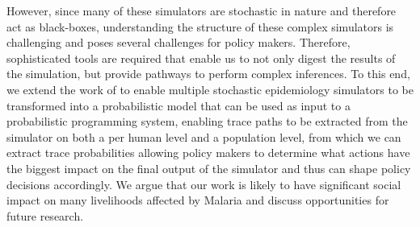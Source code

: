 \documentclass{article}
\begin{document}
However, since many of these simulators are stochastic in nature and therefore act as black-boxes, understanding the structure of these complex simulators is challenging and poses several challenges for policy makers. 
Therefore, sophisticated tools are required that enable us to not only digest the results of the simulation, but provide pathways to perform complex inferences. 
To this end, we extend the work of \citep{baydin2018efficient} to enable multiple stochastic epidemiology simulators to be transformed into a probabilistic model that can be used as input to a probabilistic programming system, enabling trace paths to be extracted from the simulator on both a per human level and a population level, from which we can extract trace probabilities allowing policy makers to determine what actions have the biggest impact on the final output of the simulator and thus can shape policy decisions accordingly.
 We argue that our work is likely to have significant social impact on many livelihoods affected by Malaria and discuss opportunities for future research.



\end{document}
